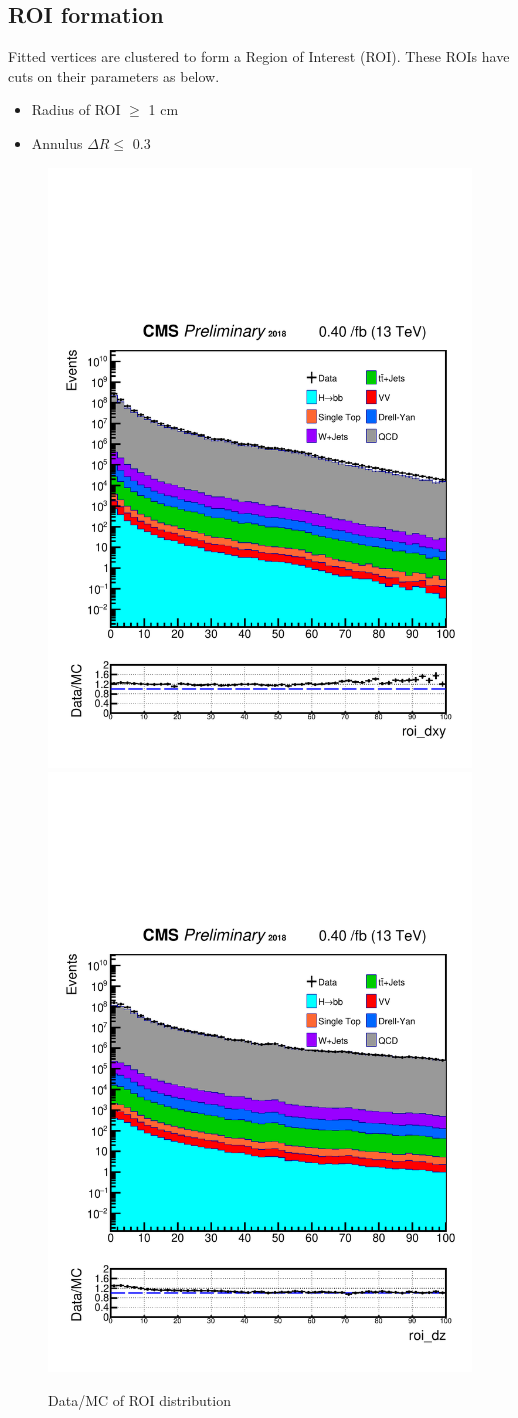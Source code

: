 \subsection{ROI formation}\label{sec:ROI_ROIformation}

Fitted vertices are clustered to form a Region of Interest (ROI).
These ROIs have cuts on their parameters as below.
\begin{itemize}
  \item Radius of ROI $\geq$ 1 cm
  \item Annulus $\Delta R \leq$ 0.3 
\end{itemize}

\begin{figure}[h!]
  \caption{Data/MC of ROI distribution}
  \label{fig:ROIs}
  \centering
  \includegraphics[width=0.47\linewidth]{figs/Data_AnalysisNoteplot_MS-15_ctauS-10_roi_dxy.pdf}
  \includegraphics[width=0.47\linewidth]{figs/Data_AnalysisNoteplot_MS-15_ctauS-10_roi_dz.pdf}
\end{figure}

